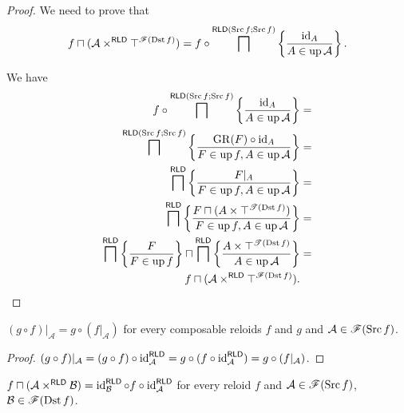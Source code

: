 \begin{proof}
We need to prove that 
\[
f\sqcap(\mathcal{A}\times^{\mathsf{RLD}}\top^{\mathscr{F}(\operatorname{Dst} f)})=f\circ\bigsqcap^{\mathsf{RLD}(\operatorname{Src} f;\operatorname{Src} f)}\left\{ \frac{\operatorname{id}_{A}}{A\in\operatorname{up}\mathcal{A}}\right\}.
\]


We have
\begin{align*}
f\circ\bigsqcap^{\mathsf{RLD}(\operatorname{Src} f;\operatorname{Src} f)}\left\{ \frac{\operatorname{id}_{A}}{A\in\operatorname{up}\mathcal{A}}\right\} & =\\
\bigsqcap^{\mathsf{RLD}(\operatorname{Src} f;\operatorname{Src} f)}\left\{ \frac{\operatorname{GR}(F)\circ\operatorname{id}_{A}}{F\in\operatorname{up} f,A\in\operatorname{up}\mathcal{A}}\right\} & =\\
\bigsqcap^{\mathsf{RLD}}\left\{ \frac{F|_{A}}{F\in\operatorname{up} f,A\in\operatorname{up}\mathcal{A}}\right\} & =\\
\bigsqcap^{\mathsf{RLD}}\left\{ \frac{F\sqcap(A\times\top^{\mathscr{T}(\operatorname{Dst} f)})}{F\in\operatorname{up} f,A\in\operatorname{up}\mathcal{A}}\right\} & =\\
\bigsqcap^{\mathsf{RLD}}\left\{ \frac{F}{F\in\operatorname{up} f}\right\}\sqcap\bigsqcap^{\mathsf{RLD}}\left\{ \frac{A\times\top^{\mathscr{T}(\operatorname{Dst} f)}}{A\in\operatorname{up}\mathcal{A}}\right\} & =\\
f\sqcap(\mathcal{A}\times^{\mathsf{RLD}}\top^{\mathscr{F}(\operatorname{Dst} f)}).
\end{align*}
\end{proof}
\begin{thm}
$(g\circ f)|_{\mathcal{A}}=g\circ(f|_{\mathcal{A}})$ for every composable
reloids $f$ and $g$ and $\mathcal{A}\in\mathscr{F}(\operatorname{Src} f)$.\end{thm}
\begin{proof}
$(g\circ f)|_{\mathcal{A}}=(g\circ f)\circ\operatorname{id}_{\mathcal{A}}^{\mathsf{\mathsf{RLD}}}=g\circ(f\circ\operatorname{id}_{\mathcal{A}}^{\mathsf{\mathsf{RLD}}})=g\circ(f|_{\mathcal{A}})$.\end{proof}
\begin{thm}
$f\sqcap(\mathcal{A}\times^{\mathsf{RLD}}\mathcal{B})=\operatorname{id}_{\mathcal{B}}^{\mathsf{\mathsf{RLD}}}\circ f\circ\operatorname{id}_{\mathcal{A}}^{\mathsf{\mathsf{RLD}}}$
for every reloid $f$ and $\mathcal{A}\in\mathscr{F}(\operatorname{Src} f)$, $\mathcal{B}\in\mathscr{F}(\operatorname{Dst} f)$.\end{thm}
